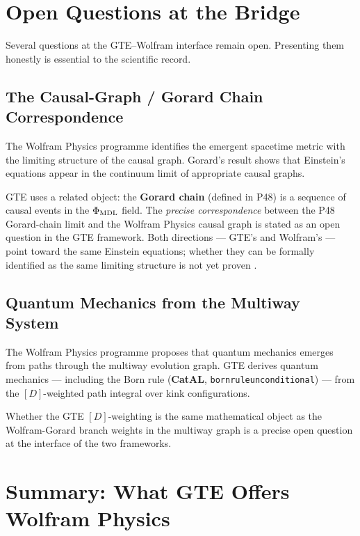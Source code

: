 \documentclass[11pt,a4paper]{article}
\newcommand{\term}[1]{\textbf{#1}}
\newcommand{\lean}[1]{%
  \penalty-100
  \begingroup\def\_{\textunderscore\allowbreak}\texttt{#1}\endgroup}
\newcommand{\CatAL}{\textbf{CatAL}}
\begin{document}
\section{Open Questions at the Bridge}
\label{sec:open}

Several questions at the GTE--Wolfram interface remain open.  Presenting them
honestly is essential to the scientific record.

\subsection{The Causal-Graph / Gorard Chain Correspondence}

The Wolfram Physics programme identifies the emergent spacetime metric with the
limiting structure of the causal graph.  Gorard's result shows that Einstein's
equations appear in the continuum limit of appropriate causal graphs.

GTE uses a related object: the \term{Gorard chain} (defined in P48) is a
sequence of causal events in the $\Phi_{\rm MDL}$ field.  The \emph{precise
correspondence} between the P48 Gorard-chain limit and the Wolfram Physics
causal graph is stated as an open question in the GTE framework.  Both
directions — GTE's and Wolfram's — point toward the same Einstein equations;
whether they can be formally identified as the same limiting structure is not
yet proven \cite{SpivackGTECompleteFramework}.

\subsection{Quantum Mechanics from the Multiway System}

The Wolfram Physics programme proposes that quantum mechanics emerges from paths
through the multiway evolution graph.  GTE derives quantum mechanics — including
the Born rule (\CatAL, \lean{born\_rule\_unconditional}) — from the
$[D]$-weighted path integral over kink configurations.

Whether the GTE $[D]$-weighting is the same mathematical object as the
Wolfram-Gorard branch weights in the multiway graph is a precise open question
at the interface of the two frameworks.

\section{Summary: What GTE Offers Wolfram Physics}
\label{sec:summary}
\end{document}
